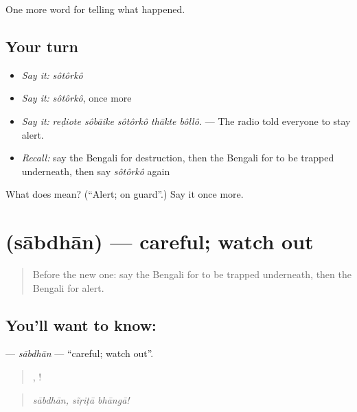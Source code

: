 \begin{grammarlens}[title={What you've built}]
One more word for telling what happened.
\end{grammarlens}

\subsection*{Your turn}
\begin{itemize}
\raggedright
  \item \emph{Say it:} \emph{sôtôrkô}
  \item \emph{Say it:} \emph{sôtôrkô}, once more
  \item \emph{Say it:} \emph{reḍiote sôbāike sôtôrkô thākte bôllô.} — The radio told everyone to stay alert.
  \item \emph{Recall:} say the Bengali for destruction, then the Bengali for to be trapped underneath, then say \emph{sôtôrkô} again
\end{itemize}

\begin{tcolorbox}[breakable,colback=teal!4,colframe=teal!35!black,title={Before you move on}]
What does  mean? (\textquotedblleft{}Alert; on guard\textquotedblright{}.) Say it once more.
\end{tcolorbox}
\section[\texorpdfstring{\bn{সাবধান} (sābdhān)}{সাবধান (sābdhān)}]{ (sābdhān) — careful; watch out}

\label{lesson:BN-C294-sabdhan}



\begin{quote}
Before the new one: say the Bengali for to be trapped underneath, then the Bengali for alert.
\end{quote}

\subsection*{You'll want to know: }
\textbf{} — \emph{sābdhān} — \textquotedblleft{}careful; watch out\textquotedblright{}.

\begin{quote}
,  !
\end{quote}

\begin{quote}
\emph{sābdhān, sĩṛiṭā bhāngā!}
\end{quote}

